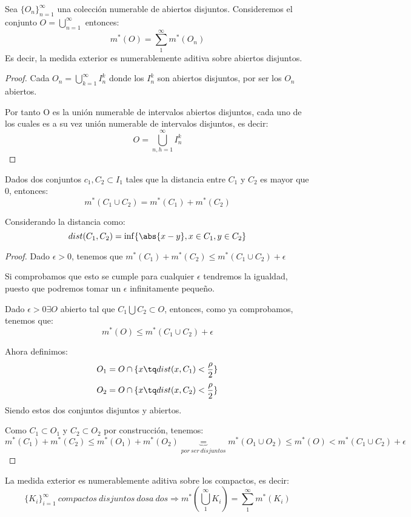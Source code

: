 \documentclass{apuntes}
\begin{document}
\begin{theorem}
Sea $\lbrace O_n\rbrace_{n=1}^{\infty}$ una colección numerable de abiertos disjuntos. Consideremos el conjunto $O=\bigcup_{n=1}^{\infty}$ entonces:
\[m^*(O)=\sum_1^{\infty}m^*(O_n)\]
Es decir, la medida exterior es numerablemente aditiva sobre abiertos disjuntos.
\end{theorem}

\begin{proof}
Cada $O_n=\bigcup_{k=1}^{\infty}I_n^k$ donde los $I_n^k$ son abiertos disjuntos, por ser los $O_n$ abiertos.

Por tanto O es la unión numerable de intervalos abiertos disjuntos, cada uno de los cuales es a su vez unión numerable de intervalos disjuntos, es decir:
\[O=\bigcup_{n,h=1}^{\infty} I_n^k\]
\end{proof}

\begin{theorem}
Dados dos conjuntos $c_1, C_2 \subset I_1$  tales que la distancia entre $C_1$  y $C_2$ es mayor que 0, entonces:
\[m^*(C_1 \cup C_2) = m^*(C_1) + m^*(C_2)\]

Considerando la distancia como:
\[dist(C_1, C_2) = \inf \lbrace \abs{x-y}, x\in C_1, y\in C_2 \rbrace \]
\end{theorem}

\begin{proof}
Dado $\epsilon > 0$, tenemos que $m^*(C_1) + m^*(C_2) \leq m^*(C_1 \cup C_2) +  \epsilon$

Si comprobamos que esto se cumple para cualquier $\epsilon$ tendremos la igualdad, puesto que podremos tomar un $\epsilon$ infinitamente pequeño.

Dado $\epsilon > 0 \exists O$ abierto tal que $C_1 \bigcup C_2 \subset O$, entonces, como ya comprobamos, tenemos que:
\[m^*(O) \leq m^*(C_1 \cup C_2) + \epsilon\] 

Ahora definimos: 
\[O_1 = O \cap \lbrace x \tq dist(x, C_1) < \frac{\rho}{2} \rbrace\]
\[O_2 = O \cap \lbrace x \tq dist(x, C_2) < \frac{\rho}{2} \rbrace\]
Siendo estos dos conjuntos disjuntos y abiertos.

Como $C_1 \subset O_1$ y $C_2 \subset O_2$ por construcción, tenemos:
\[m^*(C_1) + m^*(C_2) \leq m^*(O_1) + m^*(O_2) \underbrace{=}_{por \ ser \ disjuntos} m^*(O_1 \cup O_2) \leq m^*(O) < m^*(C_1 \cup C_2) + \epsilon\]
\end{proof}

\begin{theorem}
La medida exterior es numerablemente aditiva sobre los compactos, es decir:
\[\lbrace K_i \rbrace_{i=1}^{\infty}\ compactos \ disjuntos \ dos a \ dos \Rightarrow m^*(\bigcup_1^{\infty}K_i) = \sum_1^{\infty}m^*(K_i)\]
\end{theorem}
\end{document}
